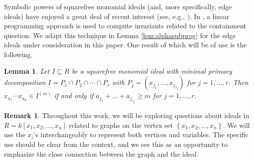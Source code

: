 \documentclass[12pt]{amsart}
\def\set#1{\left\{ {#1} \right\}}
\renewcommand{\geq}{\geqslant}
\theoremstyle{plain}
\newtheorem{lem}[theorem]{Lemma}
\theoremstyle{definition}
\newtheorem{definition}[theorem]{Definition}
\newtheorem{remark}[theorem]{Remark}
\begin{document}
Symbolic powers of squarefree monomial ideals (and, more specifically, edge ideals) have enjoyed a great deal of recent interest (see, e.g., \cite{2013:cooperembreehahoefel,2016:BocciMFO}).
In \cite{2016:BocciMFO}, a linear programming approach is used to compute invariants related to the containment question.
We adapt this technique in Lemma \ref{lem:alphasubprog} for the edge ideals under consideration in this paper.
One result of \cite{2016:BocciMFO} which will be of use is the following. %


\begin{lem}\label{lem:jdef}
Let $I \subseteq R$ be a squarefree monomial ideal with minimal primary decomposition $I = P_1 \cap P_2 \cap \cdots \cap P_r$ with $P_j = ( x_{j_1},\ldots,x_{j_{s_j}} )$ for $j = 1,\ldots,r$. Then
$x_{a_1}\cdots x_{a_n} \in I^{(m)}$ if and only if $a_{j_1}+\ldots+a _{j_{s_j}} \geq m$ for $j=1,\ldots,r$.
\end{lem}




\begin{remark}
	Throughout this work, we will be exploring questions about ideals in $R = k[x_1,x_2,\ldots,x_n]$ related to graphs on the vertex set $\set{x_1,x_2,\ldots,x_n}$.
	We will use the $x_i$'s interchangeably to represent both vertices and variables.
	The specific use should be clear from the context, and we see this as an opportunity to emphasize the close connection between the graph and the ideal.
\end{remark}








\end{document}
